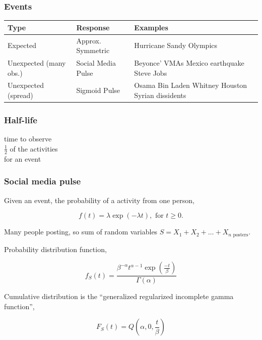 \documentclass{beamer}
\begin{document}

\begin{frame}\frametitle{Events}
\begin{table}
\begin{tabular}{ m{2cm} | m{ 2.5cm} | m{4cm}}
\hline
Type & Response & Examples \\ \hline
Expected    & Approx. \newline Symmetric & Hurricane Sandy \newline Olympics \\ \hline
Unexpected (many obs.) & Social Media \newline Pulse & Beyonce' VMAs \newline  Mexico earthquake \newline  Steve Jobs \\ \hline
Unexpected (spread) & Sigmoid \newline Pulse & Osama Bin Laden \newline  Whitney Houston \newline  Syrian dissidents \\ \hline
\end{tabular}
\end{table}
\end{frame}


\begin{frame}\frametitle{Half-life}
\begin{center}
{\Huge time to observe \\[6pt] $\frac{1}{2}$ of the activities \\[6pt] for an event}
\end{center}
\end{frame}

\begin{frame}
\frametitle{Social media pulse} 
Given an event, the probability of a activity from one person,

\begin{equation*}
f(t) = \lambda \exp(-\lambda t), \text{ for } t \geq 0.
\end{equation*}

Many people posting, so sum of random variables $S = X_1 + X_2 + \ldots + X_{n \text{ posters}}$.

Probability distribution function,

\begin{equation*}
f_S(t) = \frac{ \beta^{-\alpha} t^{\alpha-1} \exp( \frac{-t}{\beta}) } {\Gamma(\alpha)}
\end{equation*}

Cumulative distribution is the ``generalized regularized incomplete gamma function'',

\begin{equation*}
F_S(t) = Q(\alpha, 0, \frac{ t}{\beta})
\end{equation*}
\end{frame}
\end{document}
